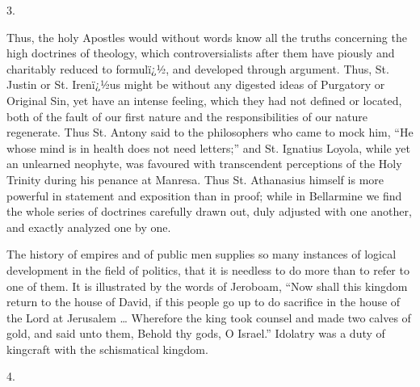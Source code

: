 3.

Thus, the holy Apostles would without words know all
the truths concerning the high doctrines of theology, which controversialists after them have piously and
charitably reduced to formulï¿½, and developed through
argument. Thus, St. Justin or St. Irenï¿½us might be
without any digested ideas of Purgatory or Original Sin,
yet have an intense feeling, which they had not defined
or located, both of the fault of our first nature and the
responsibilities of our nature regenerate. Thus St.
Antony said to the philosophers who came to mock him,
``He whose mind is in health does not need
letters;'' and St. Ignatius Loyola, while yet an
unlearned neophyte, was favoured with transcendent
perceptions of the Holy Trinity during his penance at
Manresa. Thus St. Athanasius himself is more powerful in
statement and exposition than in proof; while in
Bellarmine we find the whole series of doctrines
carefully drawn out, duly adjusted with one another, and
exactly analyzed one by one.

The history of empires and of public men supplies so
many instances of logical development in the field of
politics, that it is needless to do more than to refer to
one of them. It is illustrated by the words of Jeroboam,
``Now shall this kingdom return to the house of
David, if this people go up to do sacrifice in the house
of the Lord at Jerusalem … Wherefore the king took
counsel and made two calves of gold, and said unto them,
Behold thy gods, O Israel.'' Idolatry was a duty of
kingcraft with the schismatical kingdom.

4.

